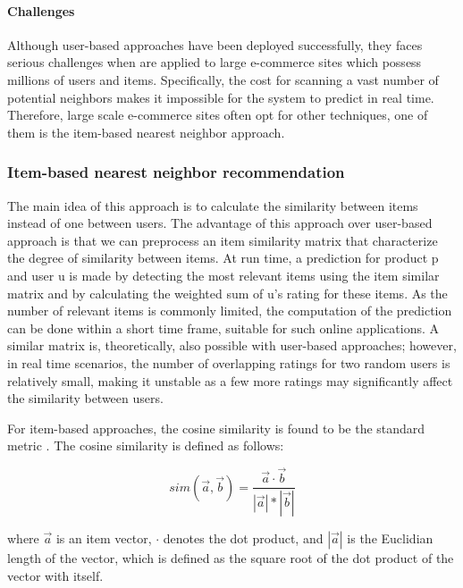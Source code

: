 \paragraph{Challenges}
Although user-based approaches have been deployed successfully, they faces serious challenges when are applied to large e-commerce sites which possess millions of users and items. Specifically, the cost for scanning a vast number of potential neighbors makes it impossible for the system to predict in real time. Therefore, large scale e-commerce sites often opt for other techniques, one of them is the item-based nearest neighbor approach.

\subsubsection{Item-based nearest neighbor recommendation}
The main idea of this approach is to calculate the similarity between items instead of one between users. The advantage of this approach over user-based approach is that we can preprocess an item similarity matrix that characterize the degree of similarity between items. At run time, a prediction for product p and user u is made by detecting the most relevant items using the item similar matrix and by calculating the weighted sum of u's rating for these items. As the number of relevant items is commonly limited, the computation of the prediction can be done within a short time frame, suitable for such online applications. A similar matrix is, theoretically, also possible with user-based approaches; however, in real time scenarios, the number of overlapping ratings for two random users is relatively small, making it unstable as a few more ratings may significantly affect the similarity between users.

For item-based approaches, the cosine similarity is found to be the standard metric \cite{jannach2010recommender}. The cosine similarity is defined as follows:

\begin{displaymath}
sim(\overrightarrow{a}, \overrightarrow{b}) = \frac{\overrightarrow{a} \cdot \overrightarrow{b}}{|\overrightarrow{a}| * | \overrightarrow{b} |}
\end{displaymath}

where \( \overrightarrow{a} \) is an item vector, \( \cdot \) denotes the dot product, and \(|\overrightarrow{a}| \) is the Euclidian length of the vector, which is defined as the square root of the dot product of the vector with itself. 


